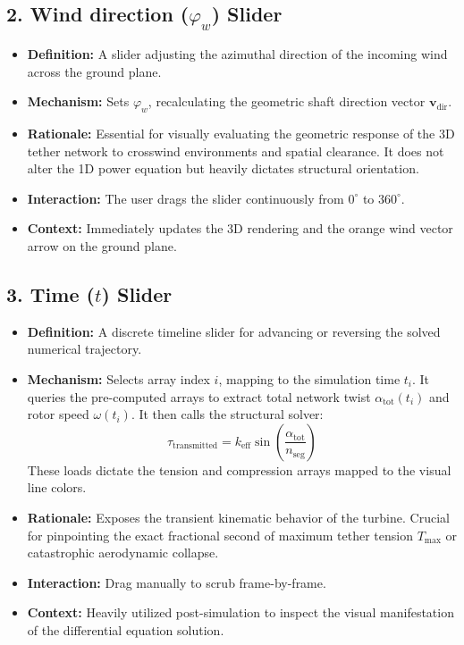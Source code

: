 \documentclass[11pt,a4paper]{article}
\begin{document}
\subsection{2. Wind direction ($\varphi_w$) Slider}
\begin{itemize}
    \item \textbf{Definition:} A slider adjusting the azimuthal direction of the incoming wind across the ground plane.
    \item \textbf{Mechanism:} Sets $\varphi_w$, recalculating the geometric shaft direction vector $\mathbf{v}_{\text{dir}}$.
    \item \textbf{Rationale:} Essential for visually evaluating the geometric response of the 3D tether network to crosswind environments and spatial clearance. It does not alter the 1D power equation but heavily dictates structural orientation.
    \item \textbf{Interaction:} The user drags the slider continuously from $0^\circ$ to $360^\circ$.
    \item \textbf{Context:} Immediately updates the 3D rendering and the orange wind vector arrow on the ground plane.
\end{itemize}

\subsection{3. Time ($t$) Slider}
\begin{itemize}
    \item \textbf{Definition:} A discrete timeline slider for advancing or reversing the solved numerical trajectory.
    \item \textbf{Mechanism:} Selects array index $i$, mapping to the simulation time $t_i$. It queries the pre-computed arrays to extract total network twist $\alpha_{\text{tot}}(t_i)$ and rotor speed $\omega(t_i)$. It then calls the structural solver:
    \begin{equation}
        \tau_{\text{transmitted}} = k_{\text{eff}} \sin\left(\frac{\alpha_{\text{tot}}}{n_{\text{seg}}}\right)
    \end{equation}
    These loads dictate the tension and compression arrays mapped to the visual line colors.
    \item \textbf{Rationale:} Exposes the transient kinematic behavior of the turbine. Crucial for pinpointing the exact fractional second of maximum tether tension $T_{\text{max}}$ or catastrophic aerodynamic collapse.
    \item \textbf{Interaction:} Drag manually to scrub frame-by-frame.
    \item \textbf{Context:} Heavily utilized post-simulation to inspect the visual manifestation of the differential equation solution.
\end{itemize}
\end{document}
